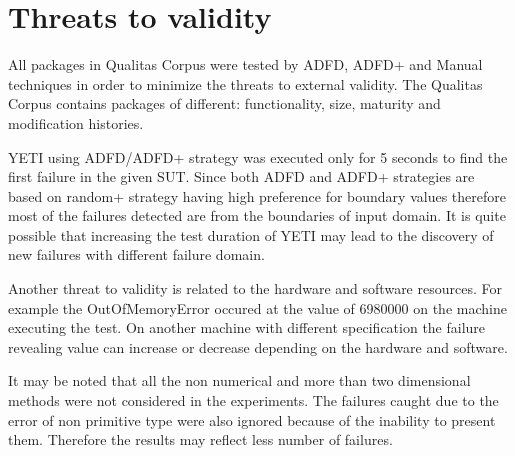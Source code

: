 


\section{Threats to validity} \label{sec:threat}
All packages in Qualitas Corpus were tested by ADFD, ADFD+ and Manual techniques in order to minimize the threats to external validity. The Qualitas Corpus contains packages of different: functionality, size, maturity and modification histories.

YETI using ADFD/ADFD+ strategy was executed only for 5 seconds to find the first failure in the given SUT. Since both ADFD and ADFD+ strategies are based on random+ strategy having high preference for boundary values therefore most of the failures detected are from the boundaries of input domain. It is quite possible that increasing the test duration of YETI may lead to the discovery of new failures with different failure domain.

Another threat to validity is related to the hardware and software resources. For example the OutOfMemoryError occured at the value of 6980000 on the machine executing the test. On another machine with different specification the failure revealing value can increase or decrease depending on the hardware and software.

It may be noted that all the non numerical and more than two dimensional methods were not considered in the experiments. The failures caught due to the error of non primitive type were also ignored because of the inability to present them. Therefore the results may reflect less number of failures.












